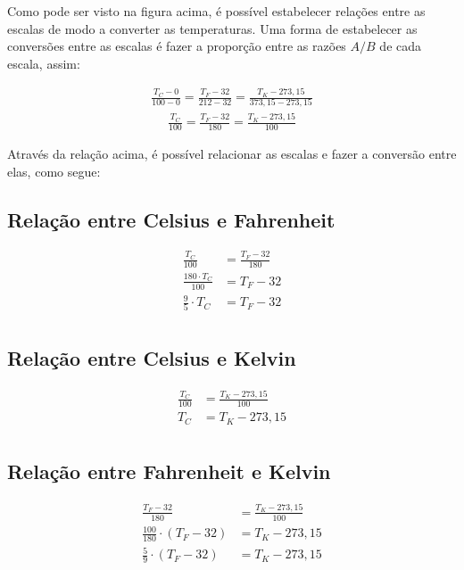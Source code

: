 Como pode ser visto na figura acima, é possível estabelecer relações entre as escalas de modo a converter as temperaturas. Uma forma de estabelecer as conversões entre as escalas é fazer a proporção entre as razões $A/B$ de cada escala, assim:

\begin{ceqn}
\begin{align*}
    \frac{T_C - 0}{100 - 0} = \frac{T_F - 32}{212 - 32} = \frac{T_K-273,15}{373,15 - 273,15}
\end{align*}
\begin{align*}
    \frac{T_C}{100} = \frac{T_F - 32}{180} = \frac{T_K-273,15}{100}
\end{align*}
\end{ceqn}

Através da relação acima, é possível relacionar as escalas e fazer a conversão entre elas, como segue:

\subsection{Relação entre Celsius e Fahrenheit}
\begin{ceqn}
    \begin{align*}
        \frac{T_C}{100} &= \frac{T_F - 32}{180} \\
        \frac{180 \cdot T_C}{100} &= T_F -32 \\
        \frac{9}{5} \cdot T_C &= T_F-32 \\
    \end{align*}
\end{ceqn}

\subsection{Relação entre Celsius e Kelvin}
\begin{ceqn}
    \begin{align*}
        \frac{T_C}{100} &= \frac{T_K-273,15}{100} \\
        T_C&=T_K-273,15 \\
    \end{align*}
\end{ceqn}

\subsection{Relação entre Fahrenheit e Kelvin}
\begin{ceqn}
    \begin{align*}
        \frac{T_F - 32}{180} &= \frac{T_K-273,15}{100} \\
        \frac{100}{180}\cdot (T_F-32) &= T_K-273,15 \\
        \frac{5}{9} \cdot (T_F-32) &= T_K-273,15 \\
    \end{align*}
\end{ceqn}

